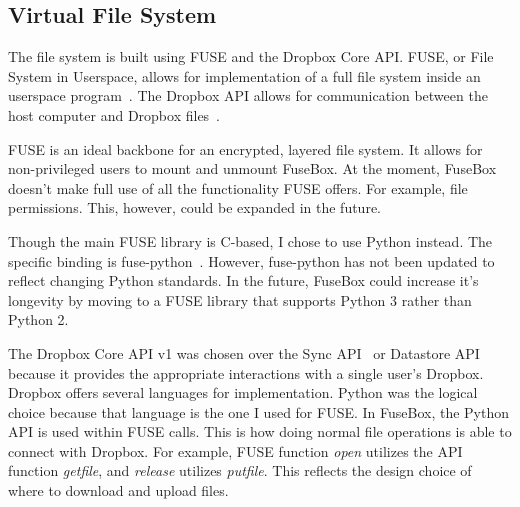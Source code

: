 \documentclass[11pt,twocolumn,letterpaper]{article}
\newcommand{\appname}{FuseBox }
\newcommand{\appnameWOspace}{FuseBox}
\begin{document}
\subsection{Virtual File System}
\label{sec:fsimp}
The file system is built using FUSE and the Dropbox Core
API. FUSE, or File System in Userspace, allows for implementation of a
full file system inside an userspace program~\cite{fuse}. The Dropbox
API allows for communication between the host computer and Dropbox
files~\cite{dropboxcore}.
\par FUSE is an ideal backbone for an encrypted, layered file system. It allows
for non-privileged users to mount and unmount \appnameWOspace. At the
moment, \appname doesn't make full use of all the functionality FUSE
offers. For example, file permissions. This, however, could be
expanded in the future. 
\par Though the main FUSE library is C-based, I chose to use Python
instead. The specific binding is
fuse-python~\cite{fuse-python}. However, fuse-python has not
been updated to reflect changing Python standards.
In the future, \appname could increase it's longevity by moving to a FUSE library
that supports Python 3 rather than Python 2.
\par The Dropbox Core API v1 was chosen over the Sync API~\cite{dropboxsync} or Datastore
API~\cite{dropboxdatastore} because it provides the appropriate interactions with a single
user's Dropbox. Dropbox offers several languages for
implementation. Python was the logical choice because that language is
the one I used for FUSE. In \appnameWOspace, the Python API is used within FUSE
calls. This is how doing normal file operations is able to connect
with Dropbox. For example, FUSE function {\em open} utilizes the API
function {\em get\textunderscore file}, and {\em release} utilizes {\em
  put\textunderscore file}. This reflects
the design choice of where to download and upload files.
\end{document}
